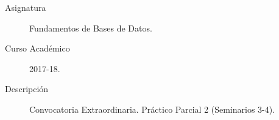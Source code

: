 \documentclass[12pt]{article}
\begin{document}

    
    

    \begin{description}
        \item[Asignatura] Fundamentos de Bases de Datos.
        \item[Curso Académico] 2017-18.
        \item[Descripción] Convocatoria Extraordinaria. Práctico Parcial 2 (Seminarios 3-4).
    
    \end{description}
    \newpage
\end{document}
